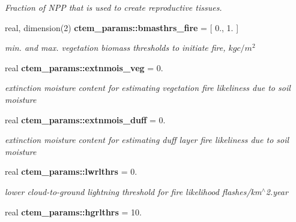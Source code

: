 \begin{DoxyCompactItemize}
\begin{DoxyCompactList}\small\item\em Fraction of N\+P\+P that is used to create reproductive tissues. \end{DoxyCompactList}\item 
\hypertarget{namespacectem__params_a62e7197e6f7c9c31dc86998dc8c9ebf2}{}real, dimension(2) {\bfseries ctem\+\_\+params\+::bmasthrs\+\_\+fire} = \mbox{[} 0., 1. \mbox{]}\label{namespacectem__params_a62e7197e6f7c9c31dc86998dc8c9ebf2}

\begin{DoxyCompactList}\small\item\em min. and max. vegetation biomass thresholds to initiate fire, $kg c/m^2$ \end{DoxyCompactList}\item 
\hypertarget{namespacectem__params_a79ef480de23397cf798e7350991780f3}{}real {\bfseries ctem\+\_\+params\+::extnmois\+\_\+veg} = 0.\label{namespacectem__params_a79ef480de23397cf798e7350991780f3}

\begin{DoxyCompactList}\small\item\em extinction moisture content for estimating vegetation fire likeliness due to soil moisture \end{DoxyCompactList}\item 
\hypertarget{namespacectem__params_a5783396d006dd77848beec6e321443b7}{}real {\bfseries ctem\+\_\+params\+::extnmois\+\_\+duff} = 0.\label{namespacectem__params_a5783396d006dd77848beec6e321443b7}

\begin{DoxyCompactList}\small\item\em extinction moisture content for estimating duff layer fire likeliness due to soil moisture \end{DoxyCompactList}\item 
\hypertarget{namespacectem__params_a4e6ad236fa1a30bbc7841a03cce0fb37}{}real {\bfseries ctem\+\_\+params\+::lwrlthrs} = 0.\label{namespacectem__params_a4e6ad236fa1a30bbc7841a03cce0fb37}

\begin{DoxyCompactList}\small\item\em lower cloud-\/to-\/ground lightning threshold for fire likelihood flashes/km$^\wedge$2.year \end{DoxyCompactList}\item 
\hypertarget{namespacectem__params_a2ec617391422478c2c13c4215060b759}{}real {\bfseries ctem\+\_\+params\+::hgrlthrs} = 10.\label{namespacectem__params_a2ec617391422478c2c13c4215060b759}


\end{DoxyCompactItemize}
